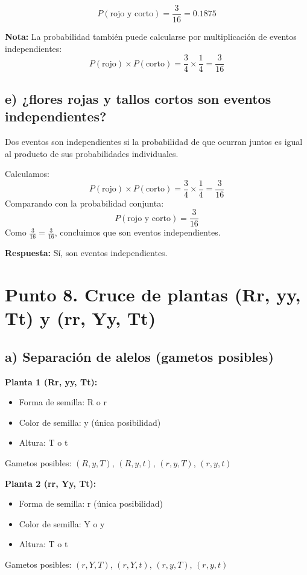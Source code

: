 \documentclass{article}
\begin{document}
	\[
	P(\text{rojo y corto}) = \frac{3}{16} = 0.1875
	\]
	
	\textbf{Nota:} La probabilidad también puede calcularse por multiplicación de eventos independientes:
	\[
	P(\text{rojo}) \times P(\text{corto}) = \frac{3}{4} \times \frac{1}{4} = \frac{3}{16}
	\]
	\subsection*{e) ¿flores rojas y tallos cortos son eventos independientes?}
	Dos eventos son independientes si la probabilidad de que ocurran juntos es igual al producto de sus probabilidades individuales.
	
	Calculamos:
	\[
	P(\text{rojo}) \times P(\text{corto}) = \frac{3}{4} \times \frac{1}{4} = \frac{3}{16}
	\]
	Comparando con la probabilidad conjunta:
	\[
	P(\text{rojo y corto}) = \frac{3}{16}
	\]
	Como \(\frac{3}{16} = \frac{3}{16}\), concluimos que son eventos independientes.
	
	\textbf{Respuesta:} Sí, son eventos independientes.
	
	

	
	\section*{Punto 8. Cruce de plantas (Rr, yy, Tt) y (rr, Yy, Tt)}
	
	\subsection*{a) Separación de alelos (gametos posibles)}
	
	\textbf{Planta 1 (Rr, yy, Tt):}
	\begin{itemize}
		\item Forma de semilla: R o r
		\item Color de semilla: y (única posibilidad)
		\item Altura: T o t
	\end{itemize}
	Gametos posibles: $(R, y, T)$, $(R, y, t)$, $(r, y, T)$, $(r, y, t)$
	
	\textbf{Planta 2 (rr, Yy, Tt):}
	\begin{itemize}
		\item Forma de semilla: r (única posibilidad)
		\item Color de semilla: Y o y
		\item Altura: T o t
	\end{itemize}
	Gametos posibles: $(r, Y, T)$, $(r, Y, t)$, $(r, y, T)$, $(r, y, t)$
	
\end{document}
